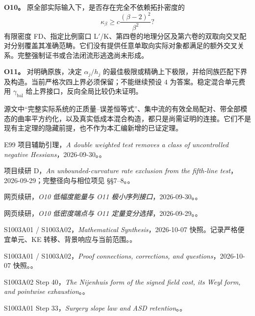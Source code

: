 \documentclass[UTF8,11pt,fontset=none]{ctexart}
\theoremstyle{definition}
\theoremstyle{remark}
\begin{document}
\textbf{O10。} 原全部实际输入下，是否存在完全不依赖拓扑密度的 \[
 \kappa_\beta\ge c\frac{(\beta-2)^2}{\beta^2}?
\] 有限密度 FD、指定比例窗口 L\({}'\)/K、第四卷的地理分区及第六卷的双取向交叉配对分别覆盖其准确范畴。它们没有提供任意单取向实际对象都满足的额外交叉关系。完整强制证书或合法闭流形逃逸尚未形成。

\textbf{O11。} 对明确原族，决定 \(\alpha_j/h_j\) 的最佳极限或精确上下极限，并给同族匹配下界及构造。当前严格次四上界必须保留；不能继续预设 \(4\) 为答案。稳定混合单元费用 \(\gamma_{\mathrm{bal}}\) 给上界接口，反向全局比较仍未证明。

源文中``完整实际系统的正质量--误差恒等式''、集中流的有效全局配对、带全部模态的曲率平方约化，以及真实低成本混合构造，都只是尚需证明的连接。它们不是现有主定理的隐藏前提，也不作为本汇编新增的已证定理。

\begin{thebibliography}{E99}
\small
{} 项目辅助引理，\emph{A double weighted test removes a class of uncontrolled negative Hessians}，2026-09-30。。

 项目续研 D，\emph{An unbounded-curvature rate exclusion from the fifth-line test}，2026-09-29；完整径向与相位项见 §§7--8。。

 网页续研，\emph{O10 低幅度能量与 O11 极小序列接口}，2026-09-30。。

 网页续研，\emph{O10 低密度端点与 O11 定量变分选择}，2026-09-29。。

 S1003A01 / S1003A02，\emph{Mathematical Synthesis}，2026-10-07 快照。记录严格便宜单元、KE 转移、背景响应与当前范围。。

 S1003A01 / S1003A02，\emph{Proof connections, corrections, and questions}，2026-10-07 快照。。

 S1003A02 Step 40，\emph{The Nijenhuis form of the signed field cost, its Weyl form, and pointwise exhaustion}。。

 S1003A01 Step 33，\emph{Surgery slope law and ASD retention}。。

\end{thebibliography}
\end{document}
